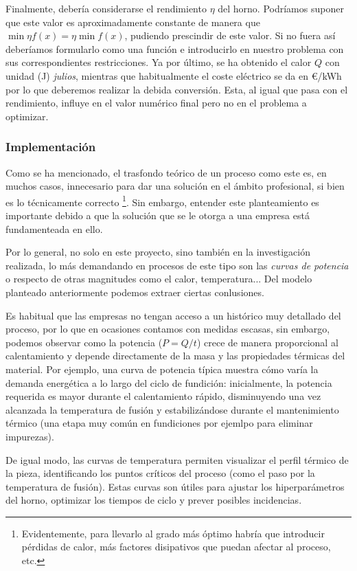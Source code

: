 Finalmente, debería considerarse el rendimiento $\eta$ del horno. Podríamos suponer que este valor es aproximadamente constante de manera que $\min{\eta f(x)} = \eta \min{f(x)}$, pudiendo prescindir de este valor. Si no fuera así deberíamos formularlo como una función e introducirlo en nuestro problema con sus correspondientes restricciones. Ya por último, se ha obtenido el calor $Q$ con unidad (J) \textit{julios}, mientras que habitualmente el coste eléctrico se da en \euro/kWh por lo que deberemos realizar la debida conversión. Esta, al igual que pasa con el rendimiento, influye en el valor numérico final pero no en el problema a optimizar.
%
%
\subsubsection{Implementación}
%
%
Como se ha mencionado, el trasfondo teórico de un proceso como este es, en muchos casos, innecesario para dar una solución en el ámbito profesional, si bien es lo técnicamente correcto \footnote{Evidentemente, para llevarlo al grado más óptimo habría que introducir pérdidas de calor, más factores disipativos que puedan afectar al proceso, etc.}. Sin embargo, entender este planteamiento es importante debido a que la solución que se le otorga a una empresa está fundamenteada en ello.

Por lo general, no solo en este proyecto, sino también en la investigación realizada, lo más demandando en procesos de este tipo son las \textit{curvas de potencia} o respecto de otras magnitudes como el calor, temperatura... Del modelo planteado anteriormente podemos extraer ciertas conlusiones.

Es habitual que las empresas no tengan acceso a un histórico muy detallado del proceso, por lo que en ocasiones contamos con medidas escasas, sin embargo, podemos observar como la potencia ($P = Q/t$) crece de manera proporcional al calentamiento y depende directamente de la masa y las propiedades térmicas del material. Por ejemplo, una curva de potencia típica muestra cómo varía la demanda energética a lo largo del ciclo de fundición: inicialmente, la potencia requerida es mayor durante el calentamiento rápido, disminuyendo una vez alcanzada la temperatura de fusión y estabilizándose durante el mantenimiento térmico (una etapa muy común en fundiciones por ejemlpo para eliminar impurezas).

De igual modo, las curvas de temperatura permiten visualizar el perfil térmico de la pieza, identificando los puntos críticos del proceso (como el paso por la temperatura de fusión). Estas curvas son útiles para ajustar los hiperparámetros del horno, optimizar los tiempos de ciclo y prever posibles incidencias.
%
%
